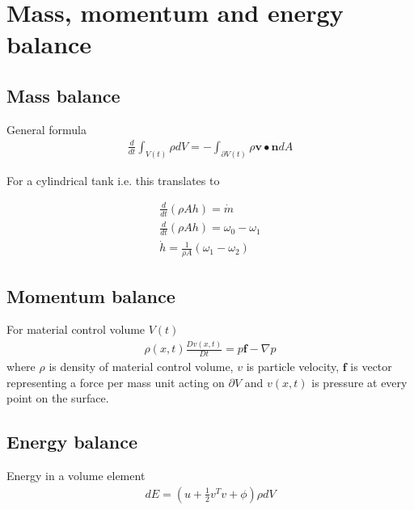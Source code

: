 \section{Mass, momentum and energy balance}
\subsection{Mass balance}
General formula
\begin{align}
    \frac{d}{dt}\int_{V(t)}\rho dV = -\int_{\partial V(t)}\rho \mathbf{v}\bullet\mathbf{n}dA
\end{align}

For a cylindrical tank i.e. this translates to 

\begin{align}
    \frac{d}{dt}(\rho A h) = \dot{m} \\
    \frac{d}{dt}(\rho A h) = \omega_0-\omega_1 \\
    \Dot{h} = \frac{1}{\rho A}(\omega_1-\omega_2)
\end{align}

\subsection{Momentum balance}
For material control volume $V(t)$
\begin{align}
    \rho(x,t)\frac{Dv(x,t)}{Dt}=p\mathbf{f}-\nabla p
\end{align}
where $\rho$ is density of material control volume, $v$ is particle velocity, $\mathbf{f}$ is vector representing a force per mass unit acting on $\partial V$ and $v(x,t)$ is pressure at every point on the surface.

\subsection{Energy balance}
Energy in a volume element
\begin{align}
    dE = (u + \frac{1}{2}v^Tv+\phi)\rho dV
\end{align}